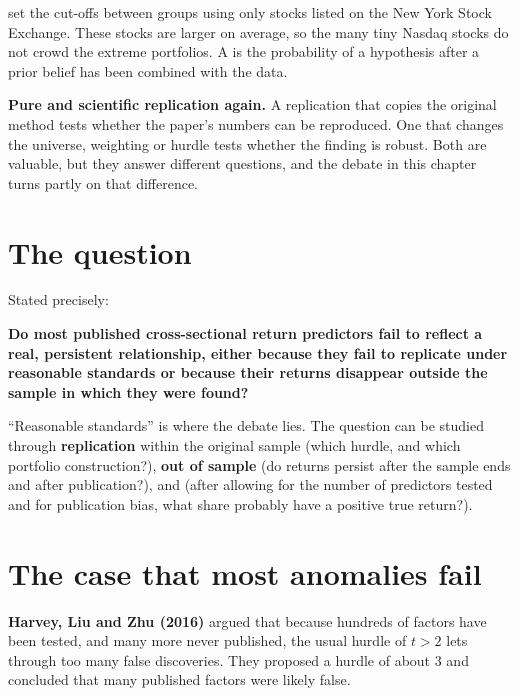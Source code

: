  set the cut-offs between groups using only stocks listed on the New York Stock Exchange. These stocks are larger on average, so the many tiny Nasdaq stocks do not crowd the extreme portfolios. A  is the probability of a hypothesis after a prior belief has been combined with the data.

\textbf{Pure and scientific replication again.} A replication that copies the original method tests whether the paper's numbers can be reproduced. One that changes the universe, weighting or hurdle tests whether the finding is robust. Both are valuable, but they answer different questions, and the debate in this chapter turns partly on that difference.

\section{The question}
\label{sec:19-claim}

Stated precisely:

\begin{callout}
\textbf{Do most published cross-sectional return predictors fail to reflect a real, persistent relationship, either because they fail to replicate under reasonable standards or because their returns disappear outside the sample in which they were found?}
\end{callout}

``Reasonable standards'' is where the debate lies. The question can be studied through \textbf{replication} within the original sample (which hurdle, and which portfolio construction?), \textbf{out of sample} (do returns persist after the sample ends and after publication?), and  (after allowing for the number of predictors tested and for publication bias, what share probably have a positive true return?).

\section{The case that most anomalies fail}
\label{sec:19-prosecution}

\textbf{Harvey, Liu and Zhu (2016)} argued that because hundreds of factors have been tested, and many more never published, the usual hurdle of $t > 2$ lets through too many false discoveries. They proposed a hurdle of about 3 and concluded that many published factors were likely false.

